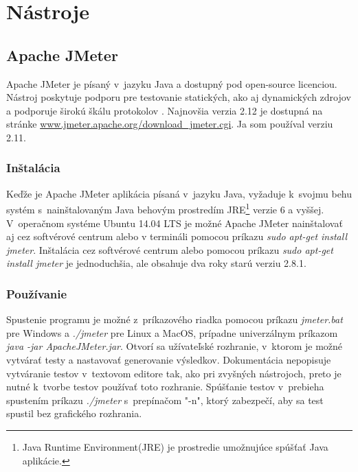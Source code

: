 \documentclass[12pt,oneside,final]{fithesis-utf8}
\begin{document}
\chapter{Nástroje}

\section{Apache JMeter}
Apache JMeter je písaný v~jazyku Java a dostupný pod open-source licenciou. Nástroj poskytuje podporu pre testovanie statických, ako aj dynamických zdrojov a podporuje širokú škálu protokolov \cite{Apache}. Najnovšia verzia 2.12 je dostupná na stránke \url{www.jmeter.apache.org/download_jmeter.cgi}. Ja som používal verziu 2.11.

\subsection{Inštalácia}
Keďže je Apache JMeter aplikácia písaná v~jazyku Java, vyžaduje k~svojmu behu systém s~nainštalovaným Java behovým prostredím JRE\footnote{Java Runtime Environment(JRE) je prostredie umožnujúce spúšťať Java aplikácie.} verzie 6 a vyššej. V~operačnom systéme Ubuntu 14.04 LTS je možné Apache JMeter nainštalovať aj cez softvérové centrum alebo v termináli pomocou príkazu \textit{sudo apt-get install jmeter}. Inštalácia cez softvérové centrum alebo pomocou príkazu \textit{sudo apt-get install jmeter} je jednoduchšia, ale obsahuje dva roky starú verziu 2.8.1. 

\subsection{Používanie}
Spustenie programu je možné z~príkazového riadka pomocou príkazu \textit{jmeter.bat} pre Windows a \textit{./jmeter} pre Linux a MacOS, prípadne univerzálnym príkazom \textit{java -jar ApacheJMeter.jar}. Otvorí sa užívateľské rozhranie, v~ktorom je možné vytvárať testy a nastavovať generovanie výsledkov. Dokumentácia nepopisuje vytváranie testov v~textovom editore tak, ako pri zvyšných nástrojoch, preto je nutné k~tvorbe testov používať toto rozhranie. Spúšťanie testov v~prebieha spustením  príkazu \textit{./jmeter} s~prepínačom "{}-n"{}, ktorý zabezpečí, aby sa test spustil bez grafického rozhrania.
\end{document}
